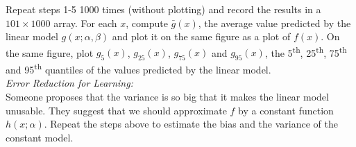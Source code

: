 Repeat steps 1-5 1000 times (without plotting) and record the results in a $101 \times 1000$ array.
For each $x$, compute $\bar{g}(x)$, the average value predicted by the linear model $g(x;\alpha,\beta)$ and plot it on the same figure as a plot of $f(x)$. 
On the same figure, plot $g_{5}(x)$, $g_{25}(x)$, $g_{75}(x)$ and $g_{95}(x)$, the 5\textsuperscript{th}, 25\textsuperscript{th}, 75\textsuperscript{th} and 95\textsuperscript{th} quantiles of the values predicted by the linear model.  \\

\noindent\textit{Error Reduction for Learning:}\\
Someone proposes that the variance is so big that it makes the linear model unusable.  
They suggest that we should approximate $f$ by a constant function  $h(x;\alpha)$. 
Repeat the steps above to estimate the bias and the variance of the constant model. \\


